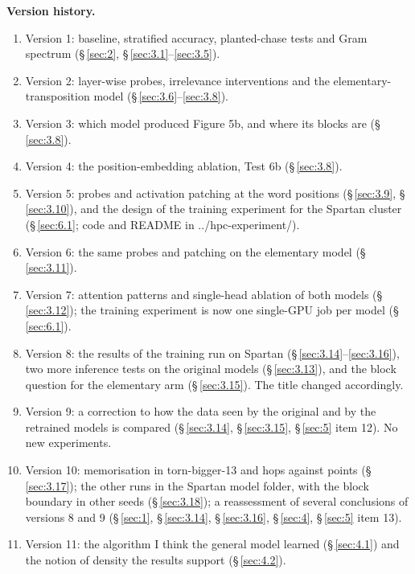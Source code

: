 \documentclass[paper=a4,fontsize=11pt,DIV=11,parskip=half,headings=small,numbers=noendperiod]{scrartcl}
\DeclareRobustCommand{\lead}[1]{\textsf{\bfseries\color{accent}#1}}
\DeclareRobustCommand{\code}[1]{{\fontseries{m}\ttfamily #1}}
\begin{document}
\begin{frontbox}
\lead{Version history.}

\begin{enumerate}
\item Version 1: baseline, stratified accuracy, planted-chase tests and Gram spectrum (\S\,\ref{sec:2},
  \S\,\ref{sec:3.1}–\ref{sec:3.5}).
\item Version 2: layer-wise probes, irrelevance interventions and the elementary-transposition model
  (\S\,\ref{sec:3.6}–\ref{sec:3.8}).
\item Version 3: which model produced Figure 5b, and where its blocks are (\S\,\ref{sec:3.8}).
\item Version 4: the position-embedding ablation, Test 6b (\S\,\ref{sec:3.8}).
\item Version 5: probes and activation patching at the word positions (\S\,\ref{sec:3.9}, \S\,\ref{sec:3.10}),
  and the design of the training experiment for the Spartan cluster (\S\,\ref{sec:6.1}; code and README in
  \code{../\allowbreak{}hpc-\allowbreak{}experiment/}).
\item Version 6: the same probes and patching on the elementary model (\S\,\ref{sec:3.11}).
\item Version 7: attention patterns and single-head ablation of both models (\S\,\ref{sec:3.12}); the training
  experiment is now one single-GPU job per model (\S\,\ref{sec:6.1}).
\item Version 8: the results of the training run on Spartan (\S\,\ref{sec:3.14}–\ref{sec:3.16}), two more
  inference tests on the original models (\S\,\ref{sec:3.13}), and the block question for the elementary arm
  (\S\,\ref{sec:3.15}). The title changed accordingly.
\item Version 9: a correction to how the data seen by the original and by the retrained models is compared
  (\S\,\ref{sec:3.14}, \S\,\ref{sec:3.15}, \S\,\ref{sec:5} item 12). No new experiments.
\item Version 10: memorisation in \code{torn-\allowbreak{}bigger-\allowbreak{}13} and hops against points
  (\S\,\ref{sec:3.17}); the other runs in the Spartan model folder, with the block boundary in other seeds
  (\S\,\ref{sec:3.18}); a reassessment of several conclusions of versions 8 and 9 (\S\,\ref{sec:1},
  \S\,\ref{sec:3.14}, \S\,\ref{sec:3.16}, \S\,\ref{sec:4}, \S\,\ref{sec:5} item 13).
\item Version 11: the algorithm I think the general model learned (\S\,\ref{sec:4.1}) and the notion of density
  the results support (\S\,\ref{sec:4.2}).

\end{enumerate}
\end{frontbox}
\end{document}
